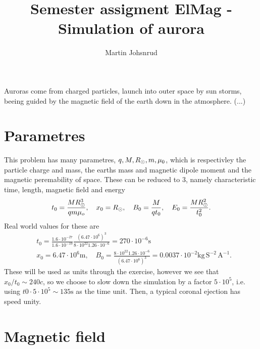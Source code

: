 \documentclass{article}
\title{Semester assigment ElMag - Simulation of aurora}
\author{Martin Johsnrud}
\begin{document}
    \maketitle

    Auroras come from charged particles, launch into outer space by sun storms, beeing guided by the magnetic field of the earth down in the atmosphere. (...) 
    
    \section*{Parametres}
        This problem has many parametres, $q, M, R_{\tiny\odot}, m, \mu_0$, which is respectivley the particle charge and mass, the earths mass and magnetic dipole moment and the magnetic peremability of space. These can be reduced to 3, namely characteristic time, length, magnetic field and energy
        \begin{equation*}
            t_0 = \frac{M R_{\tiny\odot}^3}{q m \mu_o}, \quad x_0 = R_{\tiny\odot}, \quad B_0 = \frac{M}{q t_0}, \quad E_0 = \frac{M R_{\tiny\odot}^2}{t_0^2}.
        \end{equation*}
        Real world values for these are  
        \begin{align*}
            & t_0 = \frac{1.6 \cdot 10^{-27}}{1.6\cdot10^{-19}}\frac{(6.47 \cdot 10^6)^3 }{8 \cdot 10^{22} 1.26 \cdot 10^{-6} } = 270 \cdot 10^{-6} \textrm{s}\\
            & x_0 = 6.47 \cdot 10^6 \textrm{m}, \quad
            B_0 = \frac{8 \cdot 10^{22} 1.26 \cdot 10^{-6}}{(6.47 \cdot 10^6)^3} = 0.0037 \cdot 10^{-2} \textrm{kg} \, \textrm{S}^{-2} \, \textrm{A}^{-1}.
        \end{align*}
        These will be used as units through the exercise, however we see that $x_0 / t_0 \sim 240 c$, so we choose to slow down the simulation by a factor $ 5\cdot 10^5$, i.e. using $t0 \cdot 5\cdot 10^5 \sim 135 \textrm{s}$ as the time unit. Then, a typical coronal ejection has speed unity.

    \section*{Magnetic field}
\end{document}
